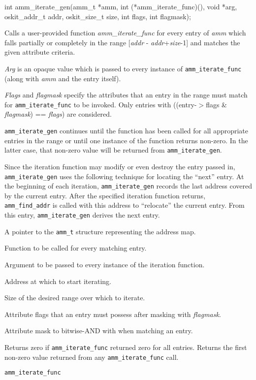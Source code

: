 \begin{apisyn}

	\funcproto int amm_iterate_gen(amm_t *amm,
		int (*amm_iterate_func)(), void *arg,
		oskit_addr_t addr, oskit_size_t size, int flags, int flagmask);
\end{apisyn}
\begin{apidesc}
	Calls a user-provided function \emph{amm_iterate_func} for every
	entry of \emph{amm} which falls partially or completely in the range
	[\emph{addr} - \emph{addr}+\emph{size}-1] and matches the given
	attribute criteria.

	\emph{Arg} is an opaque value which is passed to every instance of
	{\tt amm_iterate_func} (along with \emph{amm} and the entry itself).

	\emph{Flags} and \emph{flagmask} specify the attributes that an entry
	in the range must match for {\tt amm_iterate_func} to be invoked.
	Only entries with
	((entry-$>$flags \& \emph{flagmask}) == \emph{flags})
	are considered.

	{\tt amm_iterate_gen} continues until the function has been called
	for all appropriate entries in the range or until one instance of
	the function returns non-zero.
	In the latter case,
	that non-zero value will be returned from {\tt amm_iterate_gen}.

	Since the iteration function may modify or even destroy the entry
	passed in, {\tt amm_iterate_gen} uses the following technique for
	locating the ``next'' entry.
	At the beginning of each iteration, {\tt amm_iterate_gen} records the
	last address covered by the current entry.
	After the specified iteration function returns,
	{\tt amm_find_addr} is called with this address to ``relocate''
	the current entry.
	From this entry, {\tt amm_iterate_gen} derives the next entry.
\end{apidesc}
\begin{apiparm}
	\item[amm]
		A pointer to the {\tt amm_t} structure
		representing the address map.
	\item[amm_iterate_func]
		Function to be called for every matching entry.
	\item[arg]
		Argument to be passed to every instance of the iteration
		function.
	\item[addr]
		Address at which to start iterating.
	\item[size]
		Size of the desired range over which to iterate.
	\item[flags]
		Attribute flags that an entry must possess after masking
		with \emph{flagmask}.
	\item[flagmask]
		Attribute mask to bitwise-AND with when matching an entry.
\end{apiparm}
\begin{apiret}
	Returns zero if {\tt amm_iterate_func} returned zero for all entries.
	Returns the first non-zero value returned from any
	{\tt amm_iterate_func} call.
\end{apiret}
\begin{apirel}
	{\tt amm_iterate_func}
\end{apirel}


